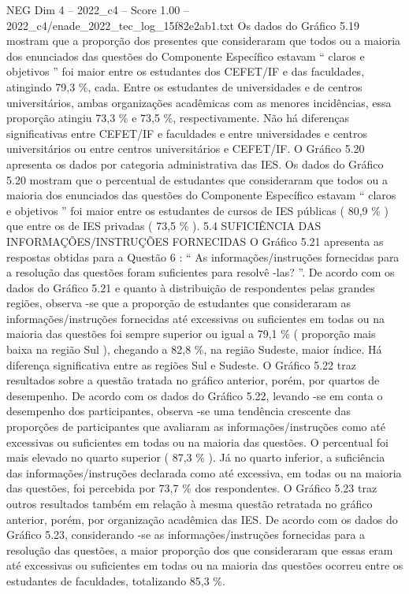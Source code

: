 \begin{textsample}{NEG Dim 4 – 2022\_c4 – Score 1.00 – 2022\_c4/enade\_2022\_tec\_log\_15f82e2ab1.txt}
Os dados do Gráfico 5.19 mostram que a proporção dos presentes que consideraram que todos ou a maioria dos enunciados das questões do Componente Específico estavam “ claros e objetivos ” foi maior entre os estudantes dos CEFET/IF e das faculdades, atingindo 79,3 \%, cada.
Entre os estudantes de universidades e de centros universitários, ambas organizações acadêmicas com as menores incidências, essa proporção atingiu 73,3 \% e 73,5 \%, respectivamente.
Não há diferenças significativas entre CEFET/IF e faculdades e entre universidades e centros universitários ou entre centros universitários e CEFET/IF.
O Gráfico 5.20 apresenta os dados por categoria administrativa das IES.
Os dados do Gráfico 5.20 mostram que o percentual de estudantes que consideraram que todos ou a maioria dos enunciados das questões do Componente Específico estavam “ claros e objetivos ” foi maior entre os estudantes de cursos de IES públicas ( 80,9 \% ) que entre os de IES privadas ( 73,5 \% ). 5.4 SUFICIÊNCIA DAS INFORMAÇÕES/INSTRUÇÕES FORNECIDAS O Gráfico 5.21 apresenta as respostas obtidas para a Questão 6 : “ As informações/instruções fornecidas para a resolução das questões foram suficientes para resolvê -las? ”.
De acordo com os dados do Gráfico 5.21 e quanto à distribuição de respondentes pelas grandes regiões, observa -se que a proporção de estudantes que consideraram as informações/instruções fornecidas até excessivas ou suficientes em todas ou na maioria das questões foi sempre superior ou igual a 79,1 \% ( proporção mais baixa na região Sul ), chegando a 82,8 \%, na região Sudeste, maior índice.
Há diferença significativa entre as regiões Sul e Sudeste.
O Gráfico 5.22 traz resultados sobre a questão tratada no gráfico anterior, porém, por quartos de desempenho.
De acordo com os dados do Gráfico 5.22, levando -se em conta o desempenho dos participantes, observa -se uma tendência crescente das proporções de participantes que avaliaram as informações/instruções como até excessivas ou suficientes em todas ou na maioria das questões.
O percentual foi mais elevado no quarto superior ( 87,3 \% ).
Já no quarto inferior, a suficiência das informações/instruções declarada como até excessiva, em todas ou na maioria das questões, foi percebida por 73,7 \% dos respondentes.
O Gráfico 5.23 traz outros resultados também em relação à mesma questão retratada no gráfico anterior, porém, por organização acadêmica das IES.
De acordo com os dados do Gráfico 5.23, considerando -se as informações/instruções fornecidas para a resolução das questões, a maior proporção dos que consideraram que essas eram até excessivas ou suficientes em todas ou na maioria das questões ocorreu entre os estudantes de faculdades, totalizando 85,3 \%.

\end{textsample}
